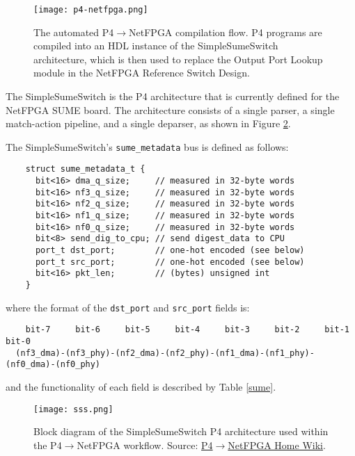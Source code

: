 \begin{figure}[ht]
	\centering
	\texttt{[image: p4-netfpga.png]}
	\caption{The automated P4$\rightarrow$NetFPGA compilation flow. P4 programs are compiled into an HDL instance of the SimpleSumeSwitch architecture, which is then used to replace the Output Port Lookup module in the NetFPGA Reference Switch Design.}
	\label{fig:p4-netfpga}
\end{figure}

The SimpleSumeSwitch is the P4 architecture that is currently defined for the NetFPGA SUME board. The architecture consists of a single parser, a single match-action pipeline, and a single deparser, as shown in Figure \ref{sss}.

The SimpleSumeSwitch’s \verb|sume_metadata| bus is defined as follows:

{\renewcommand{\baselinestretch}{0.8}\small
	\begin{verbatim}
    struct sume_metadata_t {
      bit<16> dma_q_size;     // measured in 32-byte words
      bit<16> nf3_q_size;     // measured in 32-byte words
      bit<16> nf2_q_size;     // measured in 32-byte words
      bit<16> nf1_q_size;     // measured in 32-byte words
      bit<16> nf0_q_size;     // measured in 32-byte words
      bit<8> send_dig_to_cpu; // send digest_data to CPU
      port_t dst_port;        // one-hot encoded (see below)
      port_t src_port;        // one-hot encoded (see below)
      bit<16> pkt_len;        // (bytes) unsigned int
    }
	\end{verbatim}
}

where the format of the \verb|dst_port| and \verb|src_port| fields is:

{\renewcommand{\baselinestretch}{0.8}\small
	\begin{verbatim}
    bit-7     bit-6     bit-5     bit-4     bit-3     bit-2     bit-1     bit-0
  (nf3_dma)-(nf3_phy)-(nf2_dma)-(nf2_phy)-(nf1_dma)-(nf1_phy)-(nf0_dma)-(nf0_phy)
	\end{verbatim}
}

and the functionality of each field is described by Table \ref{sume}. 

\begin{figure}[h]
	\centering
	\texttt{[image: sss.png]}
	\caption{Block diagram of the SimpleSumeSwitch P4 architecture used within the P4$\rightarrow$NetFPGA workflow. Source: \href{https://github.com/NetFPGA/P4-NetFPGA-public/wiki/Workflow-Overview\#simplesumeswitch-architecture}{P4$\rightarrow$NetFPGA Home Wiki}.} 
	\label{sss}
\end{figure}

